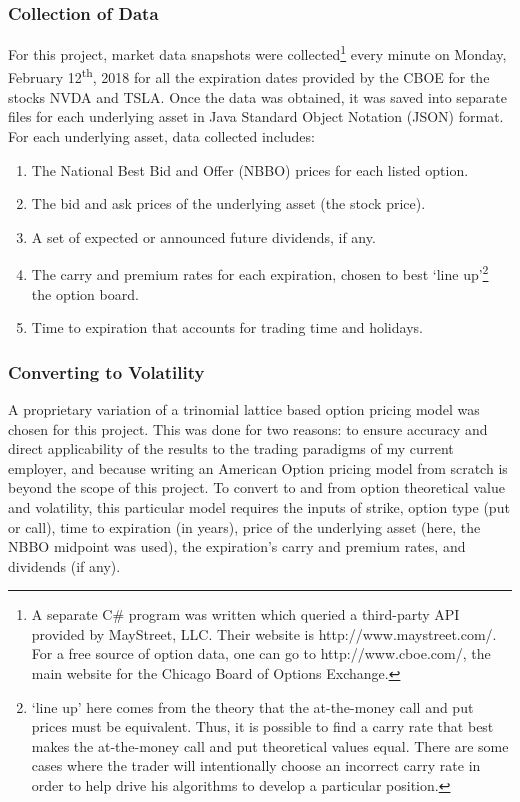 \documentclass[12pt, a4paper, notitlepage]{article}
\numberwithin{equation}{subsection}
\numberwithin{figure}{subsection}
\numberwithin{table}{subsection}
\newcommand{\newpar}{\newline \newline}
\begin{document}
\subsubsection{Collection of Data}\label{sec:CollectionOfData}
For this project, market data snapshots were collected\footnote{A separate C\# program was written which queried a third-party API provided by MayStreet, LLC.  Their website is http://www.maystreet.com/.  For a free source of option data, one can go to http://www.cboe.com/, the main website for the Chicago Board of Options Exchange.} every minute on Monday, February 12\textsuperscript{th}, 2018 for all the expiration dates provided by the CBOE for the stocks NVDA and TSLA.  Once the data was obtained, it was saved into separate files for each underlying asset in Java Standard Object Notation (JSON) format.
\newpar
For each underlying asset, data collected includes:
    \begin{enumerate}
    	\item	The National Best Bid and Offer (NBBO) prices for each listed option.
        \item	The bid and ask prices of the underlying asset (the stock price).
        \item	A set of expected or announced future dividends, if any.
        \item	The carry and premium rates for each expiration, chosen to best `line up'\footnote{`line up' here comes from the theory that the at-the-money call and put prices must be equivalent.  Thus, it is possible to find a carry rate that best makes the at-the-money call and put theoretical values equal.  There are some cases where the trader will intentionally choose an incorrect carry rate in order to help drive his algorithms to develop a particular position.} the option board.
        \item	Time to expiration that accounts for trading time and holidays.
    \end{enumerate}
    
\subsubsection{Converting to Volatility}\label{sec:ConvertingToVol}
A proprietary variation of a trinomial lattice based option pricing model was chosen for this project.  This was done for two reasons: to ensure accuracy and direct applicability of the results to the trading paradigms of my current employer, and because writing an American Option pricing model from scratch is beyond the scope of this project.  To convert to and from option theoretical value and volatility, this particular model requires the inputs of strike, option type (put or call), time to expiration (in years), price of the underlying asset (here, the NBBO midpoint was used), the expiration's carry and premium rates, and dividends (if any).
\end{document}
